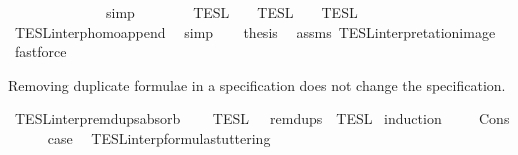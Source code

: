 \begin{isabellebody}
%
\isadelimproof
%
\endisadelimproof
%
\isatagproof
{}\isamarkupfalse%
\ {\isacharminus}\isanewline
\ \ \isamarkupfalse%
\ {\isacartoucheopen}{\isasymphi}\ {\isacharhash}\ {\isasymPhi}\ {\isacharequal}\ {\isacharbrackleft}{\isasymphi}{\isacharbrackright}\ {\isacharat}\ {\isasymPhi}{\isacartoucheclose}\ \isamarkupfalse%
\ simp\isanewline
\ \ \isamarkupfalse%
\ {\isacartoucheopen}{\isasymlbrakk}{\isasymlbrakk}\ {\isasymphi}\ {\isacharhash}\ {\isasymPhi}\ {\isasymrbrakk}{\isasymrbrakk}\isactrlsub T\isactrlsub E\isactrlsub S\isactrlsub L\ {\isacharequal}\ {\isasymlbrakk}{\isasymlbrakk}\ {\isacharbrackleft}{\isasymphi}{\isacharbrackright}\ {\isasymrbrakk}{\isasymrbrakk}\isactrlsub T\isactrlsub E\isactrlsub S\isactrlsub L\ {\isasyminter}\ {\isasymlbrakk}{\isasymlbrakk}\ {\isasymPhi}\ {\isasymrbrakk}{\isasymrbrakk}\isactrlsub T\isactrlsub E\isactrlsub S\isactrlsub L{\isacartoucheclose}\isanewline
\ \ \ \ \isamarkupfalse%
\ TESL{\isacharunderscore}interp{\isacharunderscore}homo{\isacharunderscore}append\ \isamarkupfalse%
\ simp\isanewline
\ \ \isamarkupfalse%
\ {\isacharquery}thesis\ \isamarkupfalse%
\ assms\ TESL{\isacharunderscore}interpretation{\isacharunderscore}image\ \isamarkupfalse%
\ fastforce\isanewline
{}\isamarkupfalse%
%
\endisatagproof
{\isafoldproof}%
%
\isadelimproof
%
\endisadelimproof
%
\begin{isamarkuptext}%
Removing duplicate formulae in a specification does not change the specification.%
\end{isamarkuptext}\isamarkuptrue%
\isamarkupfalse%
\ TESL{\isacharunderscore}interp{\isacharunderscore}remdups{\isacharunderscore}absorb{\isacharcolon}\isanewline
\ \ {\isacartoucheopen}{\isasymlbrakk}{\isasymlbrakk}\ {\isasymPhi}\ {\isasymrbrakk}{\isasymrbrakk}\isactrlsub T\isactrlsub E\isactrlsub S\isactrlsub L\ {\isacharequal}\ {\isasymlbrakk}{\isasymlbrakk}\ remdups\ {\isasymPhi}\ {\isasymrbrakk}{\isasymrbrakk}\isactrlsub T\isactrlsub E\isactrlsub S\isactrlsub L{\isacartoucheclose}\isanewline
%
\isadelimproof
%
\endisadelimproof
%
\isatagproof
{}\isamarkupfalse%
\ {\isacharparenleft}induction\ {\isasymPhi}{\isacharparenright}\isanewline
\ \ \isamarkupfalse%
\ Cons\isanewline
\ \ \ \ \isamarkupfalse%
\ {\isacharquery}case\ \isamarkupfalse%
\ TESL{\isacharunderscore}interp{\isacharunderscore}formula{\isacharunderscore}stuttering\ \isamarkupfalse%

\end{isabellebody}
